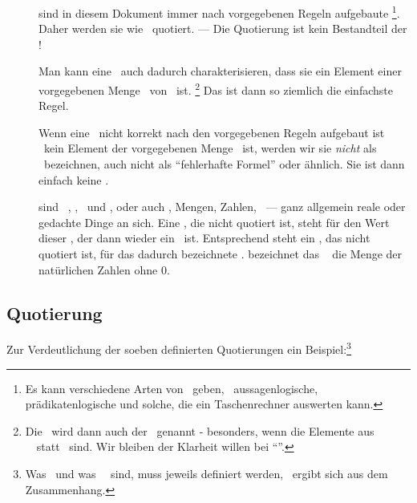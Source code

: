 \begin{description}
	\item [\Formeln] \label{def-Formel} sind in diesem Dokument immer nach vorgegebenen Regeln aufgebaute \Zeichenfolgen%
	\footnote{%
		Es kann verschiedene Arten von \Formeln\ geben, \textzB\ aussagenlogische, prädikatenlogische und solche, die ein Taschenrechner auswerten kann.
	}.
	Daher werden sie wie \Zeichenfolgen\ quotiert.
	--- Die Quotierung ist kein Bestandteil der \Zeichenfolge!

	Man kann eine \Formel\ auch dadurch charakterisieren, dass sie ein Element einer vorgegebenen Menge \MtsSprache\ von \Zeichenfolgen\ ist.%
	\footnote{%
		Die \Formel\ wird dann auch  der  \MtsSprache\ genannt - besonders, wenn die Elemente aus \MtsSprache\ \Zeichenketten\ statt \Zeichenfolgen\ sind.
		Wir bleiben der Klarheit willen bei "`\Formel"'.
	}
	Das ist dann so ziemlich die einfachste Regel.

	Wenn eine \Zeichenfolge\ nicht korrekt nach den vorgegebenen Regeln aufgebaut ist \textbzw\ kein Element der vorgegebenen Menge \MtsSprache\ ist, werden wir sie \emph{nicht} als \Formel\ bezeichnen, auch nicht als "`fehlerhafte Formel"' oder ähnlich.
	Sie ist dann einfach keine \Formel.

	\item [\Objekte] sind \textzB\ \Symbole, \Zeichenketten, \Zeichenfolgen\ und \Formeln, oder auch \Aussagen, Mengen, Zahlen, \textusw\ --- ganz allgemein reale oder gedachte Dinge an sich.
	Eine \Formel, die nicht quotiert ist, steht für den Wert dieser \Formel, der dann wieder ein \Objekt\ ist.
	Entsprechend steht ein \Symbol, das nicht quotiert ist, für das dadurch bezeichnete \Objekt.
	\textZB bezeichnet das \Symbol\ \chrqt{\MtsIN} die Menge \MtsIN der natürlichen Zahlen ohne 0.

\end{description}

\subsection{Quotierung}%
\label {sub-Quotierung}

Zur Verdeutlichung der soeben definierten Quotierungen ein Beispiel:\footnote{%
	Was \atomare\ und was \zerlegbare\ \Symbole\ sind, muss jeweils definiert werden, \textbzw\ ergibt sich aus dem Zusammenhang.
}

